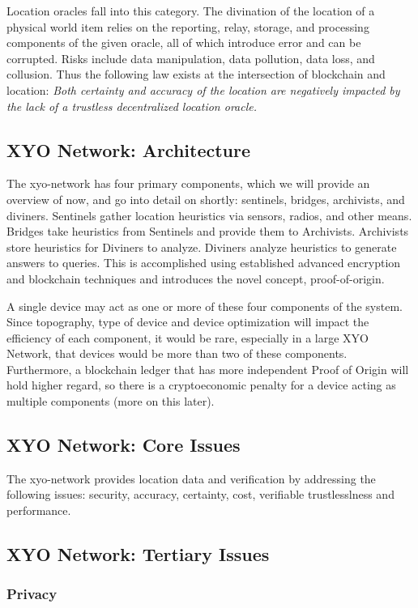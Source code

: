 \documentclass{article}
\begin{document}
Location oracles fall into this category. The divination of the location of a physical world item relies on the reporting, relay, storage, and processing components of the given oracle, all of which introduce error and can be corrupted. Risks include data manipulation, data pollution, data loss, and collusion. Thus the following law exists at the intersection of blockchain and location: \textit{Both \gls{certainty} and \gls{accuracy} of the location are negatively impacted by the lack of a trustless decentralized location oracle.}

\subsection {XYO Network: Architecture}
The \Gls{xyo-network} has four primary components, which we will provide an overview of now, and go into detail on shortly: \Glspl{sentinel}, \Glspl{bridge}, \Glspl{archivist}, and \Glspl{diviner}. Sentinels gather location \glspl{heuristic} via sensors, radios, and other means. Bridges take heuristics from Sentinels and provide them to Archivists. Archivists store heuristics for Diviners to analyze. Diviners analyze heuristics to generate answers to queries. This is accomplished using established advanced encryption and blockchain techniques and introduces the novel concept, \Gls{proof-of-origin}.

A single device may act as one or more of these four components of the system. Since topography, type of device and device optimization will impact the efficiency of each component, it would be rare, especially in a large XYO Network, that devices would be more than two of these components. Furthermore, a blockchain ledger that has more independent Proof of Origin will hold higher regard, so there is a cryptoeconomic penalty for a device acting as multiple components (more on this later).

\subsection {XYO Network: Core Issues}
The \Gls{xyo-network} provides location data and verification by addressing the following issues: security, accuracy, \gls{certainty}, cost, verifiable trustlesslness and performance.

\subsection {XYO Network: Tertiary Issues}
\subsubsection{Privacy}
\end{document}
